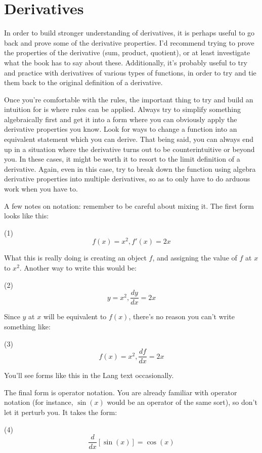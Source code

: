 \documentclass[12pt]{amsart}
\begin{document}
\section{Derivatives}

In order to build stronger understanding of derivatives, it is perhaps useful to go back and prove some of the derivative properties. I'd recommend trying to prove the properties of the derivative (sum, product, quotient), or at least investigate what the book has to say about these. Additionally, it's probably useful to try and practice with derivatives of various types of functions, in order to try and tie them back to the original definition of a derivative.

Once you're comfortable with the rules, the important thing to try and build an intuition for is where rules can be applied. Always try to simplify something algebraically first and get it into a form where you can obviously apply the derivative properties you know. Look for ways to change a function into an equivalent statement which you can derive. That being said, you can always end up in a situation where the derivative turns out to be counterintuitive or beyond you. In these cases, it might be worth it to resort to the limit definition of a derivative. Again, even in this case, try to break down the function using algebra derivative properties into multiple derivatives, so as to only have to do arduous work when you have to.

A few notes on notation: remember to be careful about mixing it. The first form looks like this:

(1) $$f(x) = x^2, f'(x) = 2x$$

What this is really doing is creating an object $f$, and assigning the value of $f$ at $x$ to $x^2$. Another way to write this would be:

(2) $$y = x^2, \frac{dy}{dx} = 2x$$

Since $y$ at $x$ will be equivalent to $f(x)$, there's no reason you can't write something like:

(3) $$f(x) = x^2, \frac{df}{dx} = 2x$$

You'll see forms like this in the Lang text occasionally. 

The final form is operator notation. You are already familiar with operator notation (for instance, $\sin(x)$ would be an operator of the same sort), so don't let it perturb you. It takes the form:

(4) $$\frac{d}{dx}[ \sin(x) ] = \cos(x)$$
\end{document}
